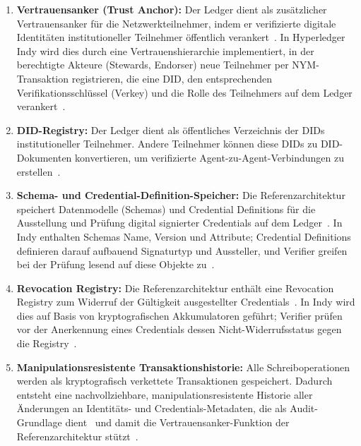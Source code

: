 \begin{enumerate}
  \item \textbf{Vertrauensanker (Trust Anchor):} Der Ledger dient als zusätzlicher Vertrauensanker für die Netzwerkteilnehmer, indem er verifizierte digitale Identitäten institutioneller Teilnehmer öffentlich verankert~\cite{erler2023}. In Hyperledger Indy wird dies durch eine Vertrauenshierarchie implementiert, in der berechtigte Akteure (Stewards, Endorser) neue Teilnehmer per NYM-Transaktion registrieren, die eine DID, den entsprechenden Verifikationsschlüssel (Verkey) und die Rolle des Teilnehmers auf dem Ledger verankert~\cite{torongo2023}.
  \item \textbf{DID-Registry:} Der Ledger dient als öffentliches Verzeichnis der DIDs institutioneller Teilnehmer. Andere Teilnehmer können diese DIDs zu DID-Dokumenten konvertieren, um verifizierte Agent-zu-Agent-Verbindungen zu erstellen~\cite{erler2023}.
  \item \textbf{Schema- und Credential-Definition-Speicher:} Die Referenzarchitektur speichert Datenmodelle (Schemas) und Credential Definitions für die Ausstellung und Prüfung digital signierter Credentials auf dem Ledger~\cite{erler2023}. In Indy enthalten Schemas Name, Version und Attribute; Credential Definitions definieren darauf aufbauend Signaturtyp und Aussteller, und Verifier greifen bei der Prüfung lesend auf diese Objekte zu~\cite{torongo2023}.
  \item \textbf{Revocation Registry:} Die Referenzarchitektur enthält eine Revocation Registry zum Widerruf der Gültigkeit ausgestellter Credentials~\cite{erler2023}. In Indy wird dies auf Basis von kryptografischen Akkumulatoren geführt; Verifier prüfen vor der Anerkennung eines Credentials dessen Nicht-Widerrufsstatus gegen die Registry~\cite{torongo2023}.
  \item \textbf{Manipulationsresistente Transaktionshistorie:} Alle Schreiboperationen werden als kryptografisch verkettete Transaktionen gespeichert. Dadurch entsteht eine nachvollziehbare, manipulationsresistente Historie aller Änderungen an Identitäts- und Credentials-Metadaten, die als Audit-Grundlage dient~\cite{torongo2023} und damit die Vertrauensanker-Funktion der Referenzarchitektur stützt~\cite{erler2023}.
\end{enumerate}

